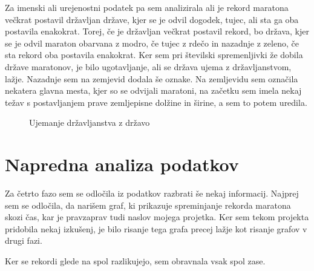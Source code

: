 \documentclass[11pt,a4paper]{article}
\begin{document}
Za imenski ali urejenostni podatek pa sem analizirala ali je rekord maratona večkrat postavil državljan države, kjer se je odvil dogodek, tujec, ali sta ga oba postavila enakokrat. Torej, če je državljan večkrat postavil rekord, bo država, kjer se je odvil maraton obarvana z modro, če tujec z rdečo in nazadnje z zeleno, če sta rekord oba postavila enakokrat.
Ker sem pri številski spremenljivki že dobila države maratonov, je bilo ugotavljanje, ali se država ujema z državljanstvom, lažje.
Nazadnje sem na zemjevid dodala še oznake. Na zemljevidu sem označila nekatera glavna mesta, kjer so se odvijali maratoni, na začetku sem imela nekaj težav s postavljanjem prave zemljepisne dolžine in širine, a sem to potem uredila.

\begin{figure}[H]
  \caption{Ujemanje državljanstva z državo}
  \label{fig:Zemljevid 2}
\end{figure}

\newpage
\section{Napredna analiza podatkov}

Za četrto fazo sem se odločila iz podatkov razbrati še nekaj informacij. Najprej sem se odločila, da narišem graf, ki prikazuje spreminjanje rekorda maratona skozi čas, kar je pravzaprav tudi naslov mojega projetka. Ker sem tekom projekta pridobila nekaj izkušenj, je bilo risanje tega grafa precej lažje kot risanje grafov v drugi fazi.

Ker se rekordi glede na spol razlikujejo, sem obravnala vsak spol zase.
\end{document}
